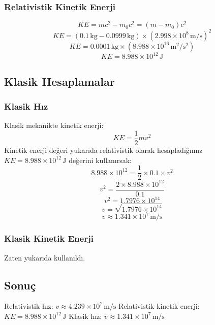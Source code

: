 \documentclass{article}
\begin{document}
\subsubsection{Relativistik Kinetik Enerji}
\[ KE = mc^2 - m_0c^2 = (m - m_0)c^2 \]
\[ KE = (0.1 \, \text{kg} - 0.0999 \, \text{kg}) \times (2.998 \times 10^8 \, \text{m/s})^2 \]
\[ KE = 0.0001 \, \text{kg} \times (8.988 \times 10^{16} \, \text{m}^2/\text{s}^2) \]
\[ KE = 8.988 \times 10^{12} \, \text{J} \]

\subsection{Klasik Hesaplamalar}
\subsubsection{Klasik Hız}
Klasik mekanikte kinetik enerji:
\[ KE = \frac{1}{2} m v^2 \]
Kinetik enerji değeri yukarıda relativistik olarak hesapladığımız \( KE = 8.988 \times 10^{12} \, \text{J} \) değerini kullanırsak:
\[ 8.988 \times 10^{12} = \frac{1}{2} \times 0.1 \times v^2 \]
\[ v^2 = \frac{2 \times 8.988 \times 10^{12}}{0.1} \]
\[ v^2 = 1.7976 \times 10^{14} \]
\[ v = \sqrt{1.7976 \times 10^{14}} \]
\[ v \approx 1.341 \times 10^7 \, \text{m/s} \]

\subsubsection{Klasik Kinetik Enerji}
Zaten yukarıda kullanıldı.

\subsection{Sonuç}
Relativistik hız: \( v \approx 4.239 \times 10^7 \, \text{m/s} \)
Relativistik kinetik enerji: \( KE = 8.988 \times 10^{12} \, \text{J} \)
Klasik hız: \( v \approx 1.341 \times 10^7 \, \text{m/s} \)
\end{document}
